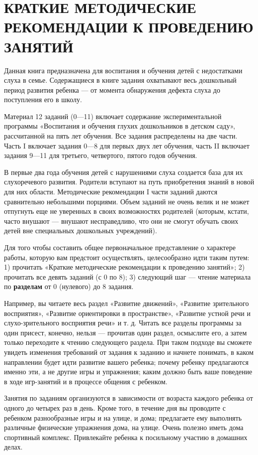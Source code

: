 \documentclass{book}
\begin{document}
\section{КРАТКИЕ МЕТОДИЧЕСКИЕ РЕКОМЕНДАЦИИ К ПРОВЕДЕНИЮ ЗАНЯТИЙ}

Данная книга предназначена для воспитания и обучения детей с
недостатками слуха в семье. Содержащиеся в книге задания охватывают весь
дошкольный период развития ребенка --- от момента обнаружения дефекта
слуха до поступления его в школу.

Материал 12 заданий (0---11) включает содержание экспериментальной
программы «Воспитания и обучения глухих дошкольников в детском саду»,
рассчитанной на пять лет обучения. Все задания распределены на две
части. Часть I включает задания 0---8 для первых двух лет обучения,
часть II включает задания 9---11 для третьего, четвертого, пятого годов
обучения.

В первые два года обучения детей с нарушениями слуха создается база для
их слухоречевого развития. Родители вступают на путь приобретения знаний
в новой для них области. Методические рекомендации I части заданий
даются сравнительно небольшими порциями. Объем заданий не очень велик и
не может отпугнуть еще не уверенных в своих возможностях родителей
(которым, кстати, часто внушают --- внушают несправедливо, что они не
смогут обучать своих детей вне специальных дошкольных учреждений).

Для того чтобы составить общее первоначальное представление о характере
работы, которую вам предстоит осуществлять, целесообразно идти таким
путем: 1) прочитать «Краткие методические рекомендации к проведению
занятий»; 2) прочитать все девять заданий (с 0 по 8); 3) следующий шаг
--- чтение материала по \textbf{разделам} от 0 (нулевого) до 8 задания.

Например, вы читаете весь раздел «Развитие движений», «Развитие
зрительного восприятия», «Развитие ориентировки в пространстве»,
«Развитие устной речи и слухо-зрительного восприятия речи» и т. д.
Читать все разделы программы за один присест, конечно, нельзя ---
прочитав один раздел, осмыслите его, а затем только переходите к чтению
следующего раздела. При таком подходе вы сможете увидеть изменения
требований от задания к заданию и начнете понимать, в каком направлении
будет идти развитие вашего ребенка; почему ребенку предлагаются именно
эти, а не другие игры и упражнения; каким должно быть ваше поведение в
ходе игр-занятий и в процессе общения с ребенком.

Занятия по заданиям организуются в зависимости от возраста каждого
ребенка от одного до четырех раз в день. Кроме того, в течение дня вы
проводите с ребенком разнообразные игры и на улице, и дома; предлагаете
ему выполнять различные физические упражнения дома, на улице. Очень
полезно иметь дома спортивный комплекс. Привлекайте ребенка к посильному
участию в домашних делах.
\end{document}
